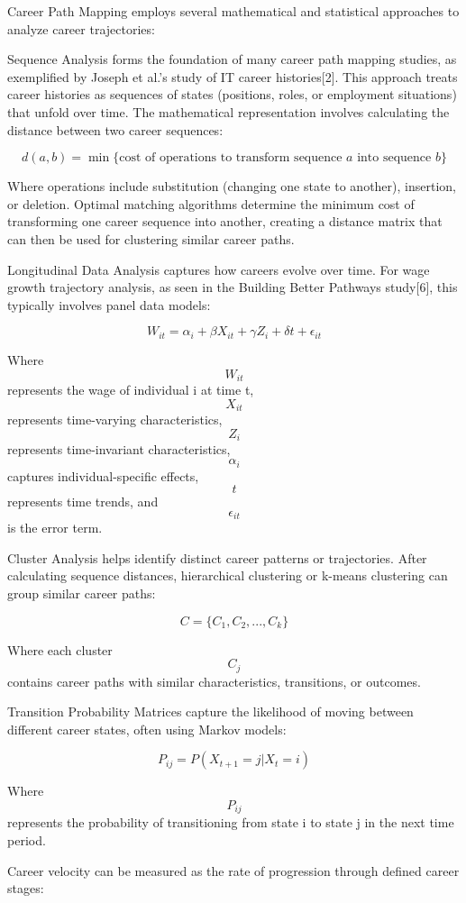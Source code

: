 \documentclass[
  letterpaper,
  DIV=11,
  numbers=noendperiod]{scrartcl}
\begin{document}
Career Path Mapping employs several mathematical and statistical
approaches to analyze career trajectories:

Sequence Analysis forms the foundation of many career path mapping
studies, as exemplified by Joseph et al.'s study of IT career
histories{[}2{]}. This approach treats career histories as sequences of
states (positions, roles, or employment situations) that unfold over
time. The mathematical representation involves calculating the distance
between two career sequences:

\[ d(a, b) = \min \{\text{cost of operations to transform sequence } a \text{ into sequence } b\} \]

Where operations include substitution (changing one state to another),
insertion, or deletion. Optimal matching algorithms determine the
minimum cost of transforming one career sequence into another, creating
a distance matrix that can then be used for clustering similar career
paths.

Longitudinal Data Analysis captures how careers evolve over time. For
wage growth trajectory analysis, as seen in the Building Better Pathways
study{[}6{]}, this typically involves panel data models:

\[ W_{it} = \alpha_i + \beta X_{it} + \gamma Z_i + \delta t + \epsilon_{it} \]

Where \[W_{it}\] represents the wage of individual i at time t,
\[X_{it}\] represents time-varying characteristics, \[Z_i\] represents
time-invariant characteristics, \[\alpha_i\] captures
individual-specific effects, \[t\] represents time trends, and
\[\epsilon_{it}\] is the error term.

Cluster Analysis helps identify distinct career patterns or
trajectories. After calculating sequence distances, hierarchical
clustering or k-means clustering can group similar career paths:

\[ C = \{C_1, C_2, ..., C_k\} \]

Where each cluster \[C_j\] contains career paths with similar
characteristics, transitions, or outcomes.

Transition Probability Matrices capture the likelihood of moving between
different career states, often using Markov models:

\[ P_{ij} = P(X_{t+1} = j | X_t = i) \]

Where \[P_{ij}\] represents the probability of transitioning from state
i to state j in the next time period.

Career velocity can be measured as the rate of progression through
defined career stages:
\end{document}
